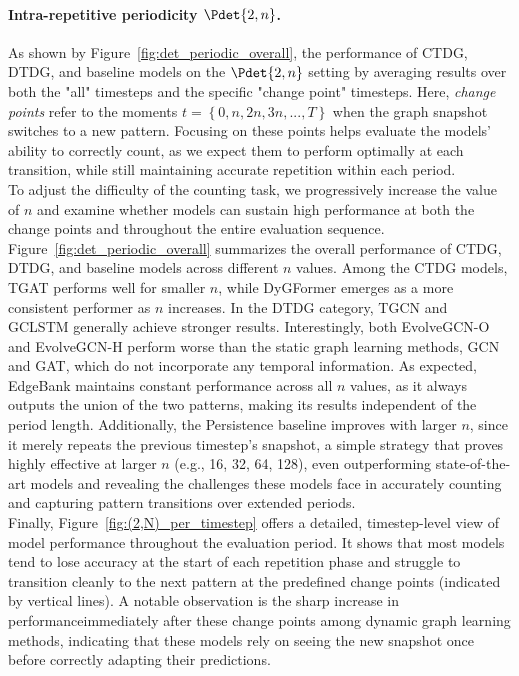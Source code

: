 \paragraph{Intra-repetitive periodicity $\Pdet{2, n}$.} As shown by Figure~\ref{fig:det_periodic_overall}, the performance of CTDG, DTDG, and baseline models on the $\Pdet{2, n}$ setting by averaging results over both the "all" timesteps and the specific "change point" timesteps. Here, \textit{change points} refer to the moments $t = \left\{0, n, 2n, 3n, ..., T\right\}$ when the graph snapshot switches to a new pattern. Focusing on these points helps evaluate the models' ability to correctly count, as we expect them to perform optimally at each transition, while still maintaining accurate repetition within each period. \\
To adjust the difficulty of the counting task, we progressively increase the value of $n$ and examine whether models can sustain high performance at both the change points and throughout the entire evaluation sequence. \\
Figure~\ref{fig:det_periodic_overall} summarizes the overall performance of CTDG, DTDG, and baseline models across different $n$ values. Among the CTDG models, TGAT performs well for smaller $n$, while DyGFormer emerges as a more consistent performer as $n$ increases. In the DTDG category, TGCN and GCLSTM generally achieve stronger results. Interestingly, both EvolveGCN-O and EvolveGCN-H perform worse than the static graph learning methods, GCN and GAT, which do not incorporate any temporal information. As expected, EdgeBank maintains constant performance across all $n$ values, as it always outputs the union of the two patterns, making its results independent of the period length. Additionally, the Persistence baseline improves with larger $n$, since it merely repeats the previous timestep’s snapshot, a simple strategy that proves highly effective at larger $n$ (e.g., 16, 32, 64, 128), even outperforming state-of-the-art models and revealing the challenges these models face in accurately counting and capturing pattern transitions over extended periods.\\
Finally, Figure~\ref{fig:(2,N)_per_timestep} offers a detailed, timestep-level view of model performance throughout the evaluation period. It shows that most models tend to lose accuracy at the start of each repetition phase and struggle to transition cleanly to the next pattern at the predefined change points (indicated by vertical lines). A notable observation is the sharp increase in performanceimmediately after these change points among dynamic graph learning methods, indicating that these models rely on seeing the new snapshot once before correctly adapting their predictions. 

